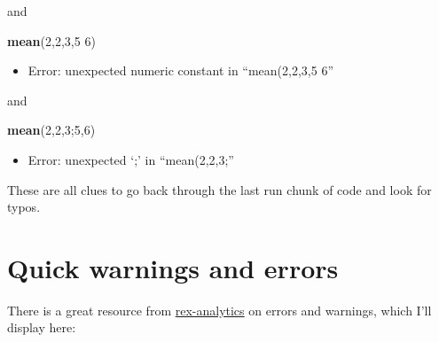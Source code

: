 \documentclass[
]{book}
\newenvironment{Shaded}{\begin{snugshade}}{\end{snugshade}}
\newcommand{\DecValTok}[1]{\textcolor[rgb]{0.00,0.00,0.81}{#1}}
\newcommand{\KeywordTok}[1]{\textcolor[rgb]{0.13,0.29,0.53}{\textbf{#1}}}
\newcommand{\NormalTok}[1]{#1}
\providecommand{\tightlist}{%
  \setlength{\itemsep}{0pt}\setlength{\parskip}{0pt}}
\begin{document}
and

\begin{Shaded}
\begin{Highlighting}[]
\KeywordTok{mean}\NormalTok{(}\DecValTok{2}\NormalTok{,}\DecValTok{2}\NormalTok{,}\DecValTok{3}\NormalTok{,}\DecValTok{5} \DecValTok{6}\NormalTok{)}
\end{Highlighting}
\end{Shaded}

\begin{itemize}
\tightlist
\item
  Error: unexpected numeric constant in ``mean(2,2,3,5 6''
\end{itemize}

and

\begin{Shaded}
\begin{Highlighting}[]
\KeywordTok{mean}\NormalTok{(}\DecValTok{2}\NormalTok{,}\DecValTok{2}\NormalTok{,}\DecValTok{3}\NormalTok{;}\DecValTok{5}\NormalTok{,}\DecValTok{6}\NormalTok{)}
\end{Highlighting}
\end{Shaded}

\begin{itemize}
\tightlist
\item
  Error: unexpected `;' in ``mean(2,2,3;''
\end{itemize}

These are all clues to go back through the last run chunk of code and look for typos.

\hypertarget{quick-warnings-and-errors}{%
\section{Quick warnings and errors}\label{quick-warnings-and-errors}}

There is a great resource from \href{http://rex-analytics.com/decoding-error-messages-r/}{rex-analytics} on errors and warnings, which I'll display here:
\end{document}
